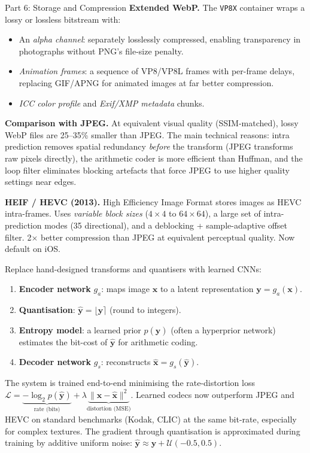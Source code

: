 \documentclass[letterpaper]{article}
\begin{document}
\begin{notes}{Part 6: Storage and Compression}
\textbf{Extended WebP.} The \texttt{VP8X} container wraps a lossy or lossless bitstream with:
\begin{itemize}
    \item An \emph{alpha channel}: separately losslessly compressed, enabling transparency in photographs without PNG's file-size penalty.
    \item \emph{Animation frames}: a sequence of VP8/VP8L frames with per-frame delays, replacing GIF/APNG for animated images at far better compression.
    \item \emph{ICC color profile} and \emph{Exif/XMP metadata} chunks.
\end{itemize}

\textbf{Comparison with JPEG.} At equivalent visual quality (SSIM-matched), lossy WebP files are 25--35\% smaller than JPEG. The main technical reasons: intra prediction removes spatial redundancy \emph{before} the transform (JPEG transforms raw pixels directly), the arithmetic coder is more efficient than Huffman, and the loop filter eliminates blocking artefacts that force JPEG to use higher quality settings near edges.



\textbf{HEIF / HEVC (2013).} High Efficiency Image Format stores images as HEVC intra-frames. Uses \emph{variable block sizes} ($4\times4$ to $64\times64$), a large set of intra-prediction modes (35 directional), and a deblocking + sample-adaptive offset filter. 2$\times$ better compression than JPEG at equivalent perceptual quality. Now default on iOS.


Replace hand-designed transforms and quantisers with learned CNNs:
\begin{enumerate}
    \item \textbf{Encoder network} $g_a$: maps image $\mathbf{x}$ to a latent representation $\mathbf{y} = g_a(\mathbf{x})$.
    \item \textbf{Quantisation}: $\hat{\mathbf{y}} = \lfloor \mathbf{y} \rceil$ (round to integers).
    \item \textbf{Entropy model}: a learned prior $p(\hat{\mathbf{y}})$ (often a hyperprior network) estimates the bit-cost of $\hat{\mathbf{y}}$ for arithmetic coding.
    \item \textbf{Decoder network} $g_s$: reconstructs $\hat{\mathbf{x}} = g_s(\hat{\mathbf{y}})$.
\end{enumerate}
The system is trained end-to-end minimising the rate-distortion loss $\mathcal{L} = \underbrace{-\log_2 p(\hat{\mathbf{y}})}_{\text{rate (bits)}} + \lambda\underbrace{\|\mathbf{x} - \hat{\mathbf{x}}\|^2}_{\text{distortion (MSE)}}$.
Learned codecs now outperform JPEG and HEVC on standard benchmarks (Kodak, CLIC) at the same bit-rate, especially for complex textures. The gradient through quantisation is approximated during training by additive uniform noise: $\hat{\mathbf{y}} \approx \mathbf{y} + \mathcal{U}(-0.5, 0.5)$.


\end{notes}
\end{document}
